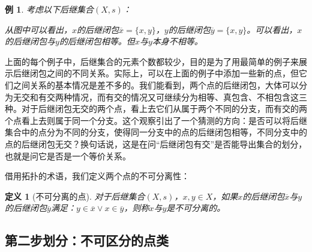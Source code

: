 \documentclass[oneside, 12pt]{ctexart}
\newtheorem{definition}{定义}[section]
\newtheorem{example}{例}[section]
\begin{document}
\begin{example}
	考虑以下后继集合$(X, s)$：
	\begin{figure}[H]
		\centering
	\end{figure}
	从图中可以看出，$x$的后继闭包$\overline{x} = \{x, y\}$，$y$的后继闭包$\overline{y} = \{x, y\}$。可以看出，$x$的后继闭包与$y$的后继闭包相等。但$x$与$y$本身不相等。
\end{example}

上面的每个例子中，后继集合的元素个数都较少，目的是为了用最简单的例子来展示后继闭包之间的不同关系。实际上，可以在上面的例子中添加一些新的点，但它们之间关系的基本情况是差不多的。我们能看到，两个点的后继闭包，大体可以分为无交和有交两种情况，而有交的情况又可继续分为相等、真包含、不相包含这三种。对于后继闭包无交的两个点，看上去它们从属于两个不同的分支，而有交的两个点看上去则属于同一个分支。这个观察引出了一个猜测的方向：是否可以将后继集合中的点分为不同的分支，使得同一分支中的点的后继闭包相等，不同分支中的点的后继闭包无交？换句话说，这是在问“后继闭包有交”是否能导出集合的划分，也就是问它是否是一个等价关系。

借用拓扑的术语，我们定义两个点的不可分离性：

\begin{definition}[不可分离的点]
	对于后继集合$(X, s)$，$x, y \in X$，如果$x$的后继闭包$\overline{x}$与$y$的后继闭包$\overline{y}$满足：$y \in \overline{x} \vee x \in \overline{y}$，则称$x$与$y$是不可分离的。
\end{definition}



\subsection{第二步划分：不可区分的点类}
\end{document}
